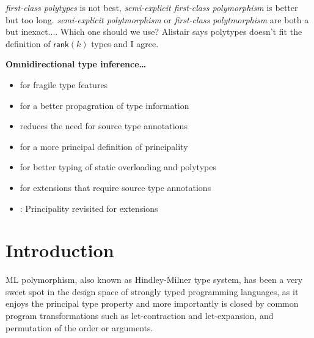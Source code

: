\documentclass[acmsmall,screen,nonacm]{acmart}
\begin{document}

\Xdidier
  {\emph{first-class polytypes} is not best,
   \emph{semi-explicit first-class polymorphism} is better but too long.
   \emph{semi-explicit polytmorphism} or
   \emph{first-class polytmorphism} are both a but inexact....
   Which one should we use?
   Alistair says polytypes doesn't fit the definition of $\mathsf{rank}(k)$
  types and I agree.}


\begin{version}[Titles]{\True}
\textbf{Omnidirectional type inference\ldots}
\begin{itemize}
\item for fragile \ML type features
\item for a better propagration of type information
\item reduces the need for source type annotations
\item for a more principal definition of principality
\item for better typing of static overloading and polytypes
\item for \ML extensions that require source type annotations
\item : Principality revisited for \ML extensions
\end{itemize}

\end{version}

\section{Introduction}

ML polymorphism, also known as Hindley-Milner type system, has been a very
sweet spot in the design space of strongly typed programming languages, as
it enjoys the principal type property and more importantly is closed by
common program transformations such as let-contraction and let-expansion,
and permutation of the order or arguments.
\end{document}

